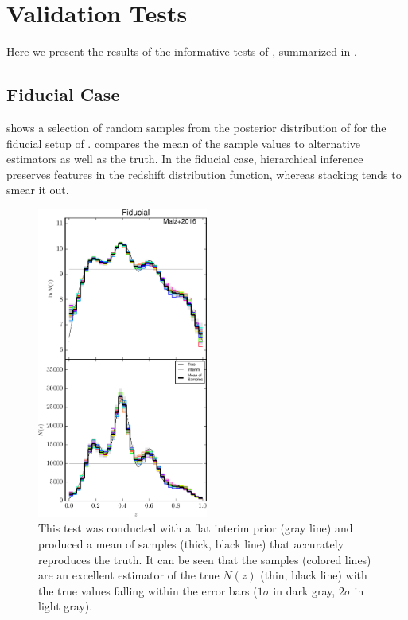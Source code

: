 \section{Validation Tests}

Here we present the results of the informative tests of , summarized in .  

\subsection{Fiducial Case}

 shows a selection of random samples from the posterior distribution of  for the fiducial setup of .  
 compares the mean of the sample values to alternative estimators as well as the truth.  
In the fiducial case, hierarchical inference preserves features in the redshift distribution function, whereas stacking tends to smear it out.  

\begin{figure}
	\includegraphics[width=0.5\textwidth]{figures/chippr/null_samps.pdf}
	\caption{This test was conducted with a flat interim prior (gray line) and produced a mean of samples (thick, black line) that accurately reproduces the truth.  
		It can be seen that the samples (colored lines) are an excellent estimator of the true $N(z)$ (thin, black line) with the true values falling within the error bars ($1\sigma$ in dark gray, $2\sigma$ in light gray).}
	\label{fig:null-samp}
\end{figure}


